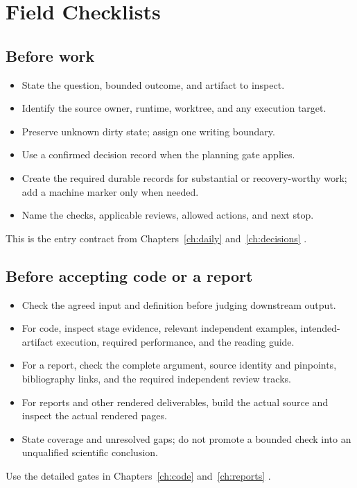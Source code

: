 \chapter{Field Checklists}
\section{Before work}
\begin{itemize}[label=$\square$]
  \item State the question, bounded outcome, and artifact to inspect.
  \item Identify the source owner, runtime, worktree, and any execution target.
  \item Preserve unknown dirty state; assign one writing boundary.
  \item Use a confirmed decision record when the planning gate applies.
  \item Create the required durable records for substantial or recovery-worthy work; add a
        machine marker only when needed.
  \item Name the checks, applicable reviews, allowed actions, and next stop.
\end{itemize}
This is the entry contract from Chapters~\ref{ch:daily} and~\ref{ch:decisions}
\cite[rules 1--3]{skill:coordination}.

\section{Before accepting code or a report}
\begin{itemize}[label=$\square$]
  \item Check the agreed input and definition before judging downstream output.
  \item For code, inspect stage evidence, relevant independent examples, intended-artifact
        execution, required performance, and the reading guide.
  \item For a report, check the complete argument, source identity and pinpoints, bibliography
        links, and the required independent review tracks.
  \item For reports and other rendered deliverables, build the actual source and inspect the
        actual rendered pages.
  \item State coverage and unresolved gaps; do not promote a bounded check into an unqualified
        scientific conclusion.
\end{itemize}
Use the detailed gates in Chapters~\ref{ch:code} and~\ref{ch:reports}
\cites[Verify and hand back]{skill:coding}[Acceptance checklist]{skill:report-production}.

